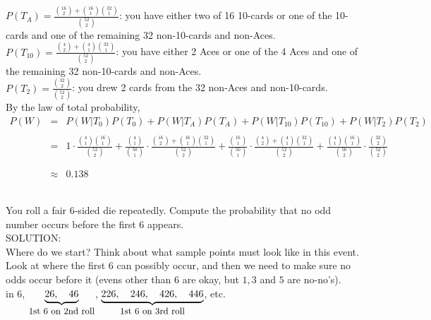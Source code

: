 \documentclass[12pt]{article}
\begin{document}
\noindent $P(T_A) = \frac {{16\choose 2}+{16\choose 1}{32\choose 1}}{{52\choose 2}}$: you have either two of 16 10-cards or one of the 10-cards and one of the remaining 32 non-10-cards and non-Aces.\\

\noindent $P(T_{10}) = \frac {{4\choose 2}+{4\choose 1}{32\choose 1}}{{52\choose 2}}$: you have either 2 Aces or one of the 4 Aces and one of the remaining 32 non-10-cards and non-Aces.\\

\noindent $P(T_2) = \frac {{32\choose 2}}{{52\choose 2}}$: you drew 2 cards from the 32 non-Aces and non-10-cards.\\

\bigskip
\noindent By the law of total probability,
\begin{eqnarray*}
P(W) &= & P(W|T_0)P(T_0) +  P(W|T_A)P(T_A) +  P(W|T_{10})P(T_{10}) +  P(W|T_2)P(T_2)\\
& & \\
& = & 1\cdot \frac {{4\choose 1}{16\choose 1}}{{52\choose 2}} +
\frac {{4\choose 1}}{{50\choose 1}}\cdot \frac {{16\choose 2}+{16\choose 1}{32\choose 1}}{{52\choose 2}} +
\frac {{16\choose 1}}{{50\choose 1}}\cdot \frac {{4\choose 2}+{4\choose 1}{32\choose 1}}{{52\choose 2}} +
\frac {{4\choose 1}{16\choose 1}}{{50\choose 2}}\cdot \frac {{32\choose 2}}{{52\choose 2}}\\
& & \\
& & \\
&\approx & 0.138\end{eqnarray*}



\newpage

\\
You roll a fair 6-sided die repeatedly.  Compute the probability that no odd number occurs before the first 6 appears.\\

\noindent SOLUTION:\\
Where do we start?  Think about what sample points must look like in this event. Look at where the first 6 can possibly occur, and
then we need to make sure no odds occur before it (evens other than 6 are okay, but $1,3$ and $5$ are no-no's). \\

 in $6$, \quad
$\underbrace{26, \quad
46}_{\mbox{\small 1st 6 on 2nd roll}}$, \quad
$\underbrace{226, \quad
246, \quad
426, \quad
446}_{\mbox{\small 1st 6 on 3rd roll}}$, \quad
etc.\\
\end{document}

